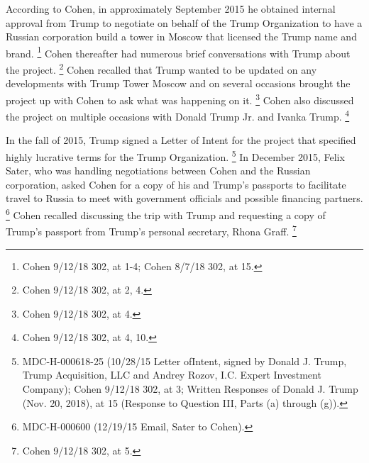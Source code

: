 {According to Cohen, in approximately September 2015 he obtained internal approval from Trump to negotiate on behalf of the Trump Organization to have a Russian corporation build a tower in Moscow that licensed the Trump name and brand.%
\footnote{Cohen 9/12/18 302, at 1-4;
Cohen 8/7/18 302, at 15.}
Cohen thereafter had numerous brief conversations with Trump about the project.%
\footnote{Cohen 9/12/18 302, at 2, 4.}
Cohen recalled that Trump wanted to be updated on any developments with Trump Tower Moscow and on several occasions brought the project up with Cohen to ask what was happening on it.%
\footnote{Cohen 9/12/18 302, at 4.}
Cohen also discussed the project on multiple occasions with Donald Trump Jr. and Ivanka Trump.%
\footnote{Cohen 9/12/18 302, at 4, 10.}

In the fall of 2015, Trump signed a Letter of Intent for the project that specified highly lucrative terms for the Trump Organization.%
\footnote{MDC-H-000618-25 (10/28/15 Letter ofIntent, signed by Donald J. Trump, Trump Acquisition, LLC and Andrey Rozov, I.C. Expert Investment Company);
Cohen 9/12/18 302, at 3;
Written Responses of Donald J. Trump (Nov. 20, 2018), at 15 (Response to Question III, Parts (a) through (g)).}
In December 2015, Felix Sater, who was handling negotiations between Cohen and the Russian corporation, asked Cohen for a copy of his and Trump's passports to facilitate travel to Russia to meet with government officials and possible financing partners.%
\footnote{MDC-H-000600 (12/19/15 Email, Sater to Cohen).}
Cohen recalled discussing the trip with Trump and requesting a copy of Trump's passport from Trump's personal secretary, Rhona Graff.%
\footnote{Cohen 9/12/18 302, at 5.}

}
